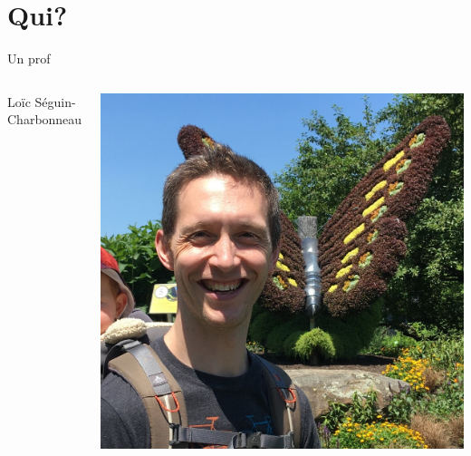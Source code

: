 \documentclass[12pt]{beamer}
\begin{document}



\section{Qui?}

\begin{frame}{Un prof}
\begin{columns}
Loïc Séguin-Charbonneau

\vspace{\baselineskip}


\includegraphics[width=\textwidth]{images/lsc.jpg}

\end{columns}
\end{frame}
\end{document}
